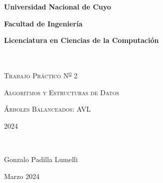 {\centering
    {\bfseries\Large Universidad Nacional de Cuyo \par}
    \vspace{-0.2cm}
    {\bfseries\Large Facultad de Ingeniería \par}
    \vspace{-0.2cm}
    {\bfseries\Large Licenciatura en Ciencias de la Computación \par}
    \pagestyle{plain}
    \vfill
    \noindent\hrulefill \\
    {\scshape\Huge Trabajo Práctico N\textsuperscript{\Large\underline o} 2\par} %
    \vspace{0.5cm}
    {\scshape\Large Algoritmos y Estructuras de Datos \par}
    {\scshape\large Árboles Balanceados: AVL \par}
    \vspace{0.5cm}
    {\scshape\Large 2024 \par} %
    \noindent\hrulefill \\
    \vspace{4cm}
    {\Large Gonzalo Padilla Lumelli \par}
    {\large Marzo 2024 \par} %
    \vfill
    \setcounter{page}{1}
    \newpage
}